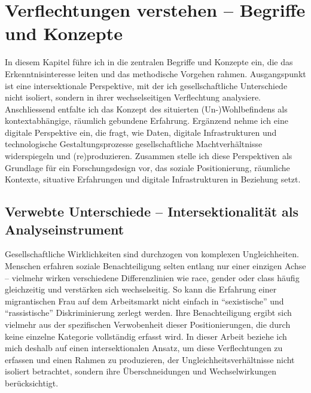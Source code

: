 
\chapter{Verflechtungen verstehen -- Begriffe und Konzepte} \label{sec:theoretischer_rahmen}

In diesem Kapitel führe ich in die zentralen Begriffe und Konzepte ein, die das Erkenntnisinteresse leiten und das methodische Vorgehen rahmen. Ausgangspunkt ist eine intersektionale Perspektive, mit der ich gesellschaftliche Unterschiede nicht isoliert, sondern in ihrer wechselseitigen Verflechtung analysiere. Anschliessend entfalte ich das Konzept des situierten (Un\nobreakdash-)Wohlbefindens als kontextabhängige, räumlich gebundene Erfahrung. Ergänzend nehme ich eine digitale Perspektive ein, die fragt, wie Daten, digitale Infrastrukturen und technologische Gestaltungsprozesse gesellschaftliche Machtverhältnisse widerspiegeln und (re)produzieren. Zusammen stelle ich diese Perspektiven als Grundlage für ein Forschungsdesign vor, das soziale Positionierung, räumliche Kontexte, situative Erfahrungen und digitale Infrastrukturen in Beziehung setzt.

\section{Verwebte Unterschiede -- Intersektionalität als Analyseinstrument}

Gesellschaftliche Wirklichkeiten sind durchzogen von komplexen Ungleichheiten. Menschen erfahren soziale Benachteiligung selten entlang nur einer einzigen Achse -- vielmehr wirken verschiedene Differenzlinien wie \gls{race}, \gls{gender} oder \gls{class} häufig gleichzeitig und verstärken sich wechselseitig. So kann die Erfahrung einer migrantischen Frau auf dem Arbeitsmarkt nicht einfach in \enquote{sexistische} und \enquote{rassistische} Diskriminierung zerlegt werden. Ihre Benachteiligung ergibt sich vielmehr aus der spezifischen Verwobenheit dieser Positionierungen, die durch keine einzelne Kategorie vollständig erfasst wird. In dieser Arbeit beziehe ich mich deshalb auf einen intersektionalen Ansatz, um diese Verflechtungen zu erfassen und einen Rahmen zu produzieren, der Ungleichheitsverhältnisse nicht isoliert betrachtet, sondern ihre Überschneidungen und Wechselwirkungen berücksichtigt.

